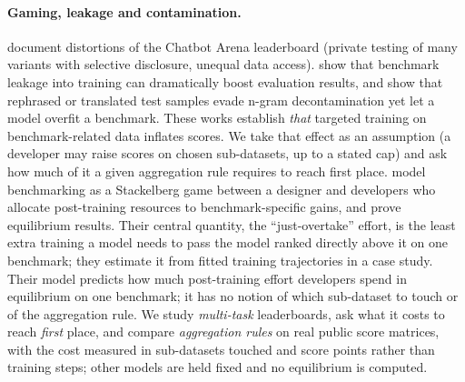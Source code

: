 \paragraph{Gaming, leakage and contamination.}
\citet{singh2025illusion} document distortions of the Chatbot Arena leaderboard (private testing of many variants with selective disclosure, unequal data access). \citet{zhou2023cheater} show that benchmark leakage into training can dramatically boost evaluation results, and \citet{yang2023rephrased} show that rephrased or translated test samples evade n-gram decontamination yet let a model overfit a benchmark. These works establish \emph{that} targeted training on benchmark-related data inflates scores. We take that effect as an assumption (a developer may raise scores on chosen sub-datasets, up to a stated cap) and ask how much of it a given aggregation rule requires to reach first place.
\citet{chen2026incentives} model benchmarking as a Stackelberg game between a designer and developers who allocate post-training resources to benchmark-specific gains, and prove equilibrium results. Their central quantity, the ``just-overtake'' effort, is the least extra training a model needs to pass the model ranked directly above it on one benchmark; they estimate it from fitted training trajectories in a case study. Their model predicts how much post-training effort developers spend in equilibrium on one benchmark; it has no notion of which sub-dataset to touch or of the aggregation rule. We study \emph{multi-task} leaderboards, ask what it costs to reach \emph{first} place, and compare \emph{aggregation rules} on real public score matrices, with the cost measured in sub-datasets touched and score points rather than training steps; other models are held fixed and no equilibrium is computed.
